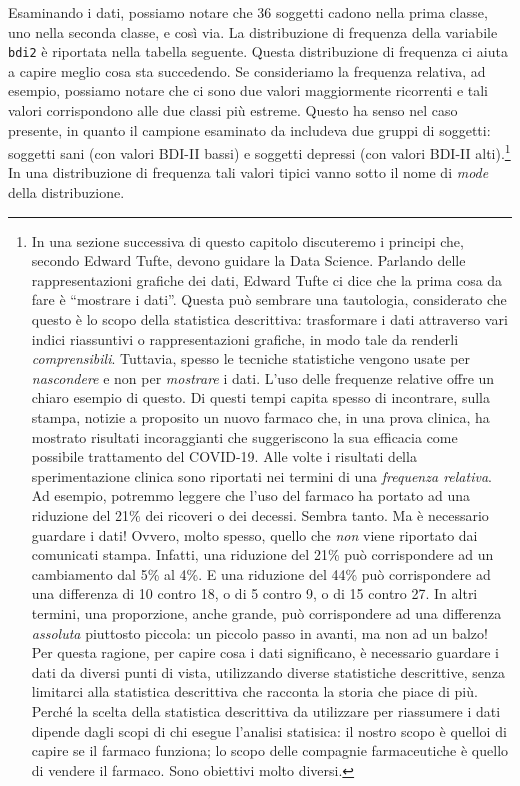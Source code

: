 \documentclass[
  11pt,
  italian,
  a4paper,
  extrafontsizes,onecolumn,openright
  ]{memoir}
\theoremstyle{definition}
\theoremstyle{definition}
\theoremstyle{definition}
\theoremstyle{definition}
\theoremstyle{remark}
\begin{document}
Esaminando i dati, possiamo notare che 36 soggetti cadono nella prima classe, uno nella seconda classe, e così via. La distribuzione di frequenza della variabile \texttt{bdi2} è riportata nella tabella seguente. Questa distribuzione di frequenza ci aiuta a capire meglio cosa sta succedendo. Se consideriamo la frequenza relativa, ad esempio, possiamo notare che ci sono due valori maggiormente ricorrenti e tali valori corrispondono alle due classi più estreme. Questo ha senso nel caso presente, in quanto il campione esaminato da \textcite{zetschefuture2019} includeva due gruppi di soggetti: soggetti sani (con valori BDI-II bassi) e soggetti depressi (con valori BDI-II alti).\footnote{In una sezione successiva di questo capitolo discuteremo i principi che, secondo Edward Tufte, devono guidare la Data Science. Parlando delle rappresentazioni grafiche dei dati, Edward Tufte ci dice che la prima cosa da fare è ``mostrare i dati''. Questa può sembrare una tautologia, considerato che questo è lo scopo della statistica descrittiva: trasformare i dati attraverso vari indici riassuntivi o rappresentazioni grafiche, in modo tale da renderli \emph{comprensibili}. Tuttavia, spesso le tecniche statistiche vengono usate per \emph{nascondere} e non per \emph{mostrare} i dati. L'uso delle frequenze relative offre un chiaro esempio di questo. Di questi tempi capita spesso di incontrare, sulla stampa, notizie a proposito un nuovo farmaco che, in una prova clinica, ha mostrato risultati incoraggianti che suggeriscono la sua efficacia come possibile trattamento del COVID-19. Alle volte i risultati della sperimentazione clinica sono riportati nei termini di una \emph{frequenza relativa}. Ad esempio, potremmo leggere che l'uso del farmaco ha portato ad una riduzione del 21\% dei ricoveri o dei decessi. Sembra tanto. Ma è necessario guardare i dati! Ovvero, molto spesso, quello che \emph{non} viene riportato dai comunicati stampa. Infatti, una riduzione del 21\% può corrispondere ad un cambiamento dal 5\% al 4\%. E una riduzione del 44\% può corrispondere ad una differenza di 10 contro 18, o di 5 contro 9, o di 15 contro 27. In altri termini, una proporzione, anche grande, può corrispondere ad una differenza \emph{assoluta} piuttosto piccola: un piccolo passo in avanti, ma non ad un balzo! Per questa ragione, per capire cosa i dati significano, è necessario guardare i dati da diversi punti di vista, utilizzando diverse statistiche descrittive, senza limitarci alla statistica descrittiva che racconta la storia che piace di più. Perché la scelta della statistica descrittiva da utilizzare per riassumere i dati dipende dagli scopi di chi esegue l'analisi statisica: il nostro scopo è quelloi di capire se il farmaco funziona; lo scopo delle compagnie farmaceutiche è quello di vendere il farmaco. Sono obiettivi molto diversi.} In una distribuzione di frequenza tali valori tipici vanno sotto il nome di \emph{mode} della distribuzione.
\end{document}
